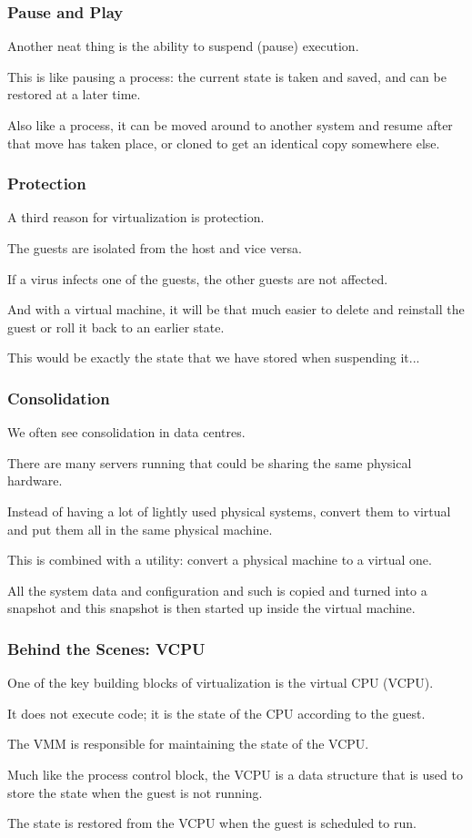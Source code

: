 \begin{frame}
\frametitle{Pause and Play}

Another neat thing is the ability to suspend (pause) execution. 

This is like pausing a process: the current state is taken and saved, and can be restored at a later time. 

Also like a process, it can be moved around to another system and resume after that move has taken place, or cloned to get an identical copy somewhere else.


\end{frame}

\begin{frame}
\frametitle{Protection}

A third reason for virtualization is protection. 

The guests are isolated from the host and vice versa. 

If a virus infects one of the guests, the other guests are not affected. 

And with a virtual machine, it will be that much easier to delete and reinstall the guest or roll it back to an earlier state. 

This would be exactly the state that we have stored when suspending it...


\end{frame}

\begin{frame}
\frametitle{Consolidation}

We often see consolidation in data centres. 

There are many servers running that could be sharing the same physical hardware. 

Instead of having a lot of lightly used physical systems, convert them to virtual and put them all in the same physical machine. 

This is combined with a utility: convert a physical machine to a virtual one.

All the system data and configuration and such is copied and turned into a snapshot and this snapshot is then started up inside the virtual machine.

\end{frame}

\begin{frame}
\frametitle{Behind the Scenes: VCPU}

One of the key building blocks of virtualization is the \alert{virtual CPU} (VCPU). 

It does not execute code; it is the state of the CPU according to the guest. 

The VMM is responsible for maintaining the state of the VCPU. 

Much like the process control block, the VCPU is a data structure that is used to store the state when the guest is not running.

The state is restored from the VCPU when the guest is scheduled to run.

\end{frame}

